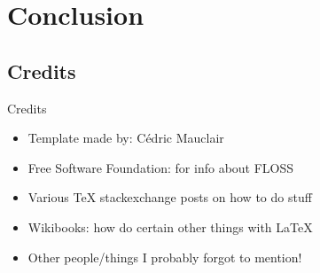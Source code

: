 \documentclass[xcolor=svgnames,handout]{beamer}
\begin{document}
\section{Conclusion}
\subsection{Credits}

\begin{frame}
  {Credits}

  \begin{itemize}
  \item Template made by: Cédric Mauclair
  \item Free Software Foundation: for info about FLOSS
  \item Various \TeX{} stackexchange posts on how to do stuff
  \item Wikibooks: how do certain other things with \LaTeX{}
  \item Other people/things I probably forgot to mention!
  \end{itemize}
\end{frame}
\end{document}
